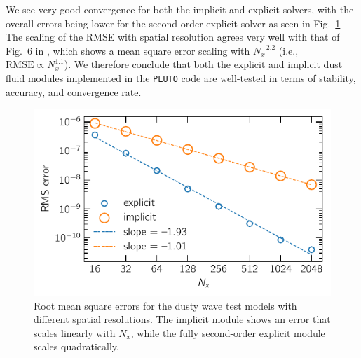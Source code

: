 \documentclass[fleqn,usenatbib,useAMS]{mnras}
\newcommand{\pluto}{\texttt{PLUTO}}
\begin{document}
We see very good convergence for both the implicit and explicit solvers, with the overall errors being lower for the second-order explicit solver as seen in Fig.~\ref{fig:space-plot}
The scaling of the RMSE with spatial resolution agrees very well with that of Fig.~6 in \citet{benitez-etal-2019}, which shows a mean square error scaling with $N_x^{-2.2}$ (i.e., $\text{RMSE}\propto N_x^{1.1}$). We therefore conclude that both the explicit and implicit dust fluid modules implemented in the \pluto{} code are well-tested in terms of stability, accuracy, and convergence rate.



\begin{figure}
	\centering
	\includegraphics[width=\columnwidth]{space-plot-adaptive-fitted.pdf}
	\caption{Root mean square errors for the dusty wave test models with different spatial resolutions. The implicit module shows an error that scales linearly with $N_x$, while the fully second-order explicit module scales quadratically.}
	\label{fig:space-plot}
\end{figure}

\end{document}
